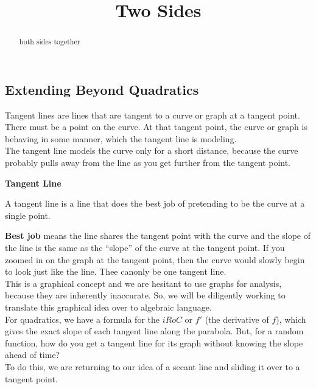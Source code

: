 \documentclass{ximera}
\title{Two Sides}
\begin{document}
\begin{abstract}
both sides together
\end{abstract}
\maketitle
 
 



\subsection*{Extending Beyond Quadratics} 


Tangent lines are lines that are tangent to a curve or graph at a tangent point. There must be a point on the curve. At that tangent point, the curve or graph is behaving in some manner, which the tangent line is modeling.  \\

The tangent line models the curve only for a short distance, because the curve probably pulls away from the line as you get further from the tangent point.\\

\begin{idea} \textbf{\textcolor{blue!55!black}{Tangent Line}}


A tangent line is a line that does the best job of pretending to be the curve at a single point.
\end{idea}


\textbf{Best job} means the line shares the tangent point with the curve and the slope of the line is the same as the ``slope'' of the curve at the tangent point. If you zoomed in on the graph at the tangent point, then the curve would slowly begin to look just like the line. Thee canonly be one tangent line.\\

This is a graphical concept and we are hesitant to use graphs for analysis, because they are inherently inaccurate. So, we will be diligently working to translate this graphical idea over to algebraic language. \\


For quadratics, we have a formula for the $iRoC$ or $f'$ (the derivative of $f$), which gives the exact slope of each tangent line along the parabola.  But, for a random function, how do you get a tangent line for its graph without knowing the slope ahead of time? \\


To do this, we are returning to our idea of a secant line and sliding it over to a tangent point. \\
\end{document}
